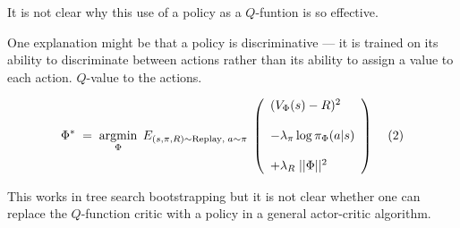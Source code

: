 {\bigskip
It is not clear why this use of a policy as a $Q$-funtion is so effective.

\bigskip
One explanation might be that a policy is discriminative --- it is trained on its ability to discriminate between actions
rather than its ability to assign a value to each action. $Q$-value to the actions.


\bigskip
$$\Phi^*\; = \;\operatorname*{argmin}_\Phi \;E_{(s,\pi,R) \sim \mathrm{Replay},\;a \sim \pi}\;\left(\begin{array}{l} (V_\Phi(s) - R)^2 \\ \\ - \lambda_\pi\log \pi_\Phi(a|s) \\ \\ + \lambda_R\;||\Phi||^2\end{array}\right)\;\;\;\;(2)$$


\bigskip
This works in tree search bootstrapping but it is not clear whether one can replace the $Q$-function critic with a policy in a general
actor-critic algorithm.





}

